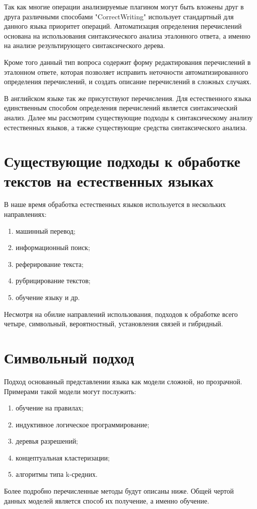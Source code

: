 \documentclass{standalone}
\begin{document}
Так как многие операции анализируемые плагином могут быть вложены друг в друга различными способами "CorrectWriting" использует стандартный для данного языка приоритет операций. Автоматизация определения перечислений основана на использования синтаксического анализа эталонного ответа, а именно на анализе результирующего синтаксического дерева.
\par Кроме того данный тип вопроса содержит форму редактирования перечислений в эталонном ответе, которая позволяет исправить неточности автоматизированного определения перечислений, и создать описание перечислений в сложных случаях.
\par В английском языке так же присутствуют перечисления. Для естественного языка единственным способом определения перечислений является синтаксический анализ. Далее мы рассмотрим существующие подходы к синтаксическому анализу естественных языков, а также существующие средства синтаксического анализа.
\section{Существующие подходы к обработке текстов на естественных языках}
\par В наше время обработка естественных языков используется в нескольких направлениях:
\begin{enumerate}
    \item машинный перевод;
    \item информационный поиск;
    \item реферирование текста;
    \item рубрицирование текстов;
    \item обучение языку и др.
\end{enumerate}
\par Несмотря на обилие направлений использования, подходов к обработке всего четыре, символьный, вероятностный, установления связей и гибридный.
\section{Символьный подход}
\par Подход основанный представлении языка как модели сложной, но прозрачной. Примерами такой модели могут послужить:
\begin{enumerate}
    \item обучение на правилах;
    \item индуктивное логическое программирование;
    \item деревья разрешений;
    \item концептуальная кластеризации;
    \item алгоритмы типа k-средних.
\end{enumerate}
\par Более подробно перечисленные методы будут описаны ниже. Общей чертой данных моделей является способ их получение, а именно обучение.
\end{document}

